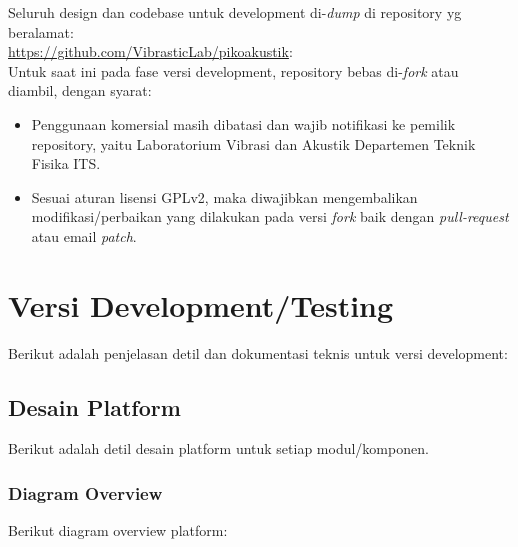\documentclass[12pt,]{article}
\begin{document}
	Seluruh design dan codebase untuk development di-\textit{dump} di repository yg beralamat:\\
	\url{https://github.com/VibrasticLab/pikoakustik}:\\
	
	Untuk saat ini pada fase versi development, repository bebas di-\textit{fork} atau diambil,
	dengan syarat:
	\begin{itemize}
		\item Penggunaan komersial masih dibatasi dan wajib notifikasi ke pemilik repository,
		yaitu Laboratorium Vibrasi dan Akustik Departemen Teknik Fisika ITS.
		
		\item Sesuai aturan lisensi GPLv2, maka diwajibkan mengembalikan modifikasi/perbaikan 
		yang dilakukan pada versi \textit{fork} baik dengan \textit{pull-request} atau email \textit{patch}.
	\end{itemize}
	
	\newpage
	\mbox{}
	
	\newpage
	\section{Versi Development/Testing}
	
	Berikut adalah penjelasan detil dan dokumentasi teknis untuk versi development:
	
	\subsection{Desain Platform}
	
	Berikut adalah detil desain platform untuk setiap modul/komponen.
	
	\subsubsection{Diagram Overview}
	
	Berikut diagram overview platform:
	
\end{document}
